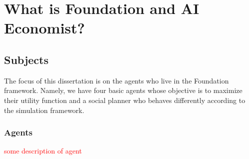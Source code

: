 \section{What is Foundation and AI Economist?}

\subsection{Subjects}

The focus of this dissertation is on the agents who live in the Foundation framework. Namely, we have four basic agents whose objective is to maximize their utility function and a social planner who behaves differently according to the simulation framework.

\subsubsection*{Agents}

\textcolor{red}{some description of agent}

